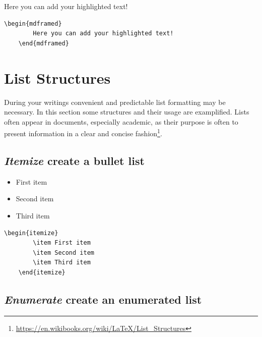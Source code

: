 \begin{mdframed}
	Here you can add your highlighted text! 	
\end{mdframed}

\begin{mdframed}
	\begin{lstlisting}[language = Tex, caption={Example for the highlighted blue box}, linewidth = 150mm]
	\begin{mdframed}
		Here you can add your highlighted text! 	
	\end{mdframed}
	\end{lstlisting}
\end{mdframed}

\section{List Structures}
During your writings convenient and predictable list formatting may be necessary. In this section some structures and their usage are examplified. Lists often appear in documents, especially academic, as their purpose is often to present information in a clear and concise fashion\footnote{\url{https://en.wikibooks.org/wiki/LaTeX/List_Structures}}.

\subsection{\emph{Itemize} create a bullet list}

\begin{itemize}
	\item First item
	\item Second item
	\item Third item
\end{itemize}

\begin{mdframed}
	\begin{lstlisting}[language = Tex, caption={Example of an itemized structure}, linewidth = 150mm]
	\begin{itemize}
		\item First item
		\item Second item
		\item Third item
	\end{itemize}
	\end{lstlisting}
\end{mdframed}

\subsection{\emph{Enumerate} create an enumerated list}

